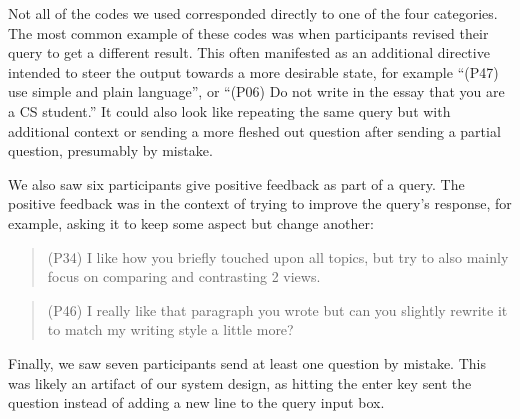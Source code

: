 \documentclass[manuscript,screen,acmsmall]{acmart}
\begin{document}
    Not all of the codes we used corresponded directly to one of the four categories.
    The most common example of these codes was when participants revised their query to get a different result.
    This often manifested as an additional directive intended to steer the output towards a more desirable state, for example ``(P47) use simple and plain language'', or ``(P06) Do not write in the essay that you are a CS student.''
    It could also look like repeating the same query but with additional context or sending a more fleshed out question after sending a partial question, presumably by mistake.
    

    We also saw six participants give positive feedback as part of a query.
    The positive feedback was in the context of trying to improve the query's response, for example, asking it to keep some aspect but change another:
    \begin{quote}
    (P34) I like how you briefly touched upon all topics, but try to also mainly focus on comparing and contrasting 2 views.
    \end{quote}
    \begin{quote}
        (P46) I really like that paragraph you wrote but can you slightly rewrite it to match my writing style a little more?
    \end{quote}

    Finally, we saw seven participants send at least one question by mistake.
    This was likely an artifact of our system design, as hitting the enter key sent the question instead of adding a new line to the query input box.

        
    
\end{document}
